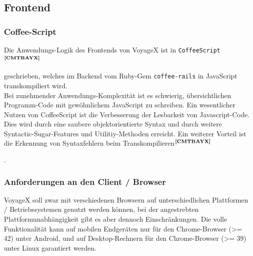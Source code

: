 \subsection{Frontend}\label{5_FE}

\subsubsection{Coffee-Script}
Die Anwendungs-Logik des Frontends von VoyageX ist in \texttt{CoffeeScript}$^{\textbf{\ref{CMTBAYX}}}$%
\addtocounter{footnote}{1}%
 geschrieben, welches im Backend vom Ruby-Gem \texttt{coffee-rails} in JavaScript transkompiliert wird.\\
Bei zunehmender Anwendungs-Komplexität ist es schwierig, übersichtlichen Programm-Code mit gewöhnlichem JavaScript zu schreiben. Ein wesentlicher Nutzen von CoffeeScript ist die Verbesserung der Lesbarkeit von Javascript-Code. Dies wird durch eine saubere objektorientierte Syntax und durch weitere Syntactic-Sugar-Features und Utilitiy-Methoden erreicht. Ein weiterer Vorteil ist die Erkennung von Syntaxfehlern beim Transkompilieren$^{\textbf{\ref{CMTBAYX}}}$%
\addtocounter{footnote}{1}%
. 

\subsubsection{Anforderungen an den Client / Browser}\label{4_ACB}
VoyageX soll zwar mit verschiedenen Browsern auf unterschiedlichen Plattformen / Betriebssystemen genutzt werden können, bei der angestrebten Plattformunabhängigkeit gibt es aber dennoch Einschränkungen. Die volle Funktionalität kann auf mobilen Endgeräten nur für den Chrome-Browser (>= 42) unter Android, und auf Desktop-Rechnern für den Chrome-Browser (>= 39) unter Linux garantiert werden.

